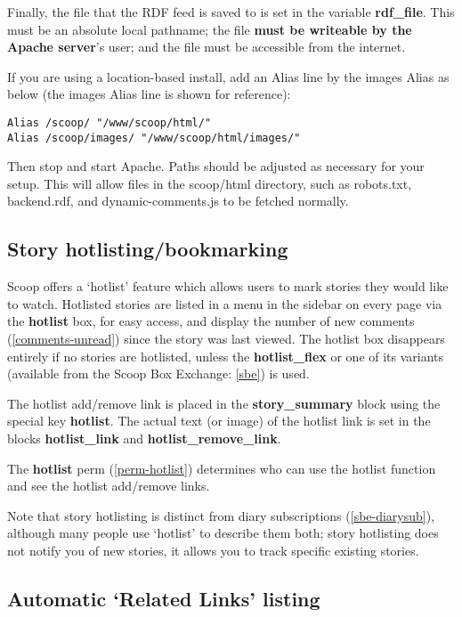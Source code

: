 Finally, the file that the RDF feed is saved to is set in the variable {\bf rdf\_file}.  This must be an absolute local pathname; the file {\bf must be writeable by the Apache server}'s user; and the file must be accessible from the internet.

If you are using a location-based install, add an Alias line by the images Alias as below (the images Alias line is shown for reference):
\begin{verbatim}
Alias /scoop/ "/www/scoop/html/"
Alias /scoop/images/ "/www/scoop/html/images/"
\end{verbatim}

Then stop and start Apache.  Paths should be adjusted as necessary for your setup.  This will allow files in the scoop/html directory, such as robots.txt, backend.rdf, and dynamic-comments.js to be fetched normally.

\subsection{Story hotlisting/bookmarking}
\label{features-hotlist}

Scoop offers a `hotlist' feature which allows users to mark stories they would like to watch. Hotlisted stories are listed in a menu in the sidebar on every page via the {\bf hotlist} box, for easy access, and display the number of new comments (\ref{comments-unread}) since the story was last viewed. The hotlist box disappears entirely if no stories are hotlisted, unless the {\bf hotlist\_flex} or one of its variants (available from the Scoop Box Exchange: \ref{sbe}) is used.

The hotlist add/remove link is placed in the {\bf story\_summary} block using the special key {\bf \latexhtml{$\vert$}{|}hotlist\latexhtml{$\vert$}{|}}. The actual text (or image) of the hotlist link is set in the blocks {\bf hotlist\_link} and {\bf hotlist\_remove\_link}.

The {\bf hotlist} perm (\ref{perm-hotlist}) determines who can use the hotlist function and see the hotlist add/remove links.

Note that story hotlisting is distinct from diary subscriptions (\ref{sbe-diarysub}), although many people use `hotlist' to describe them both; story hotlisting does not notify you of new stories, it allows you to track specific existing stories.

\subsection{Automatic `Related Links' listing}
\label{features-autorelated}

